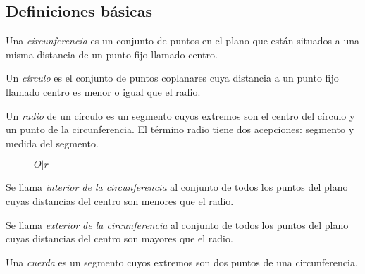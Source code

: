 \subsection{Definiciones básicas}

\begin{definition}
    Una \textit{circunferencia} es un conjunto de puntos en el plano que están situados a una misma distancia de un punto fijo llamado centro.
\end{definition}

\begin{definition}
    Un \textit{círculo} es el conjunto de puntos coplanares cuya distancia a un punto fijo llamado centro es menor o igual que el radio.
\end{definition}

\begin{definition}
    Un \textit{radio} de un círculo es un segmento cuyos extremos son el centro del círculo y un punto de la circunferencia. El término radio tiene dos acepciones: segmento y medida del segmento.
\end{definition}

\begin{figure}[!h]
    \centering
    
    \caption{$O|r$}
    \label{fig:circunferencia}
\end{figure}

\begin{definition}
    Se llama \textit{interior de la circunferencia} al conjunto de todos los puntos del plano cuyas distancias del centro son menores que el radio.
\end{definition}

\begin{definition}
    Se llama \textit{exterior de la circunferencia} al conjunto de todos los puntos del plano cuyas distancias del centro son mayores que el radio.
\end{definition}

\clearpage

\begin{definition}
    Una \textit{cuerda} es un segmento cuyos extremos son dos puntos de una circunferencia.

    \begin{figure}[!h]
        \centering
        
        \label{fig:cuerda}
    \end{figure}
    
\end{definition}


